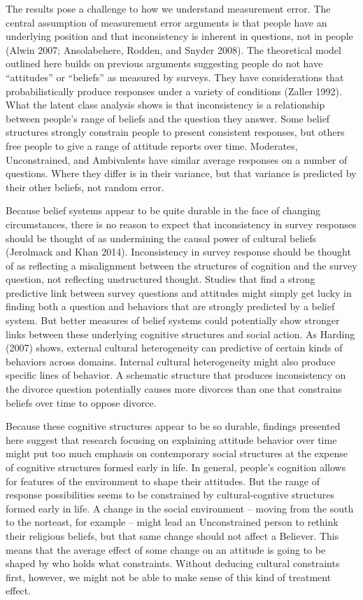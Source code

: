 \documentclass[12pt,]{article}
\begin{document}
The results pose a challenge to how we understand measurement error. The central assumption of measurement error arguments is that people have an underlying position and that inconsistency is inherent in questions, not in people (Alwin 2007; Ansolabehere, Rodden, and Snyder 2008). The theoretical model outlined here builds on previous arguments suggesting people do not have ``attitudes'' or ``beliefs'' as measured by surveys. They have considerations that probabilistically produce responses under a variety of conditions (Zaller 1992). What the latent class analysis shows is that inconsistency is a relationship between people's range of beliefs and the question they answer. Some belief structures strongly constrain people to present consistent responses, but others free people to give a range of attitude reports over time. Moderates, Unconstrained, and Ambivalents have similar average responses on a number of questions. Where they differ is in their variance, but that variance is predicted by their other beliefs, not random error.

Because belief systems appear to be quite durable in the face of changing circumstances, there is no reason to expect that inconsistency in survey responses should be thought of as undermining the causal power of cultural beliefs (Jerolmack and Khan 2014). Inconsistency in survey response should be thought of as reflecting a misalignment between the structures of cognition and the survey question, not reflecting unstructured thought. Studies that find a strong predictive link between survey questions and attitudes might simply get lucky in finding both a question and behaviors that are strongly predicted by a belief system. But better measures of belief systems could potentially show stronger links between these underlying cognitive structures and social action. As Harding (2007) shows, external cultural heterogeneity can predictive of certain kinds of behaviors across domains. Internal cultural heterogeneity might also produce specific lines of behavior. A schematic structure that produces inconsistency on the divorce question potentially causes more divorces than one that constrains beliefs over time to oppose divorce.

Because these cognitive structures appear to be so durable, findings presented here suggest that research focusing on explaining attitude behavior over time might put too much emphasis on contemporary social structures at the expense of cognitive structures formed early in life. In general, people's cognition allows for features of the environment to shape their attitudes. But the range of response possibilities seems to be constrained by cultural-cogntive structures formed early in life. A change in the social environment -- moving from the south to the norteast, for example -- might lead an Unconstrained person to rethink their religious beliefs, but that same change should not affect a Believer. This means that the average effect of some change on an attitude is going to be shaped by who holds what constraints. Without deducing cultural constraints first, however, we might not be able to make sense of this kind of treatment effect.
\end{document}

